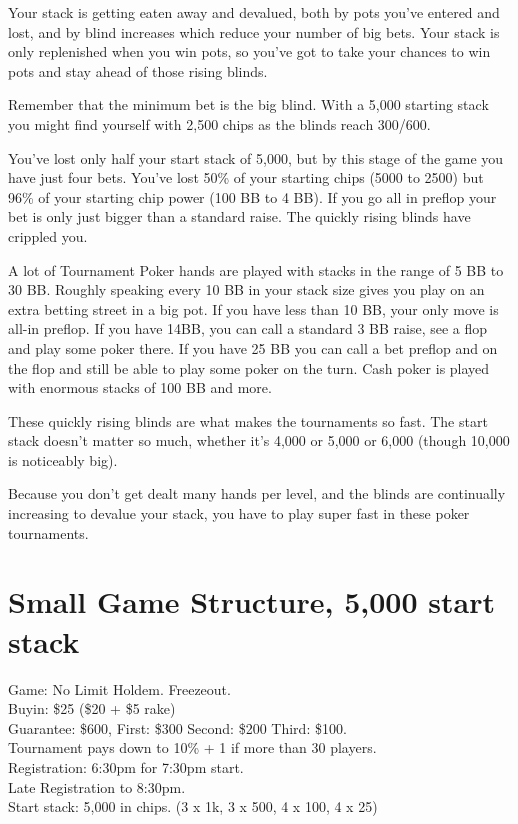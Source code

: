 Your stack is getting eaten away and devalued, both by pots you've entered
and lost, and by blind increases which reduce your number of big bets.
Your stack is only replenished when you win pots, so you've
got to take your chances to win pots and stay ahead of those rising
blinds.

Remember that the minimum bet is the big blind. With a 5,000 starting
stack you might find yourself with 2,500 chips as the blinds reach
300/600.

You've lost only half your start stack of 5,000, but by this
stage of the game you have just four bets. You've lost 50\% of your
starting chips (5000 to 2500) but 96\% of your starting chip power
(100 BB to 4 BB). If you go all in preflop your bet is only just
bigger than a standard raise. The quickly rising blinds have crippled
you.

A lot of Tournament Poker hands are played with stacks in the range of
5 BB to 30 BB. Roughly speaking every 10 BB in your stack size gives you
play on an extra betting street in a big pot. If you have less than
10 BB, your only move is all-in preflop. If you have 14BB, you can call
a standard 3 BB raise, see a flop and play some poker there. If you
have 25 BB you can call a bet preflop and on the flop and still be
able to play some poker on the turn. Cash poker is played with
enormous stacks of 100 BB and more.

These quickly rising blinds are what makes the tournaments so fast.
The start stack doesn't matter so much, whether it's 4,000 or 5,000
or 6,000 (though 10,000 is noticeably big).

Because you don't get dealt many hands per level, and the blinds are
continually increasing to devalue your stack, you have to play super fast
in these poker tournaments.

\section{Small Game Structure, 5,000 start stack}

Game: No Limit Holdem. Freezeout. \\
Buyin: \$25 (\$20 + \$5 rake) \\
Guarantee: \$600, First: \$300 Second: \$200 Third: \$100. \\
Tournament pays down to 10\% + 1 if more than 30 players. \\
Registration: 6:30pm for 7:30pm start. \\
Late Registration to 8:30pm. \\
Start stack: 5,000 in chips. (3 x 1k, 3 x 500, 4 x 100, 4 x 25)

